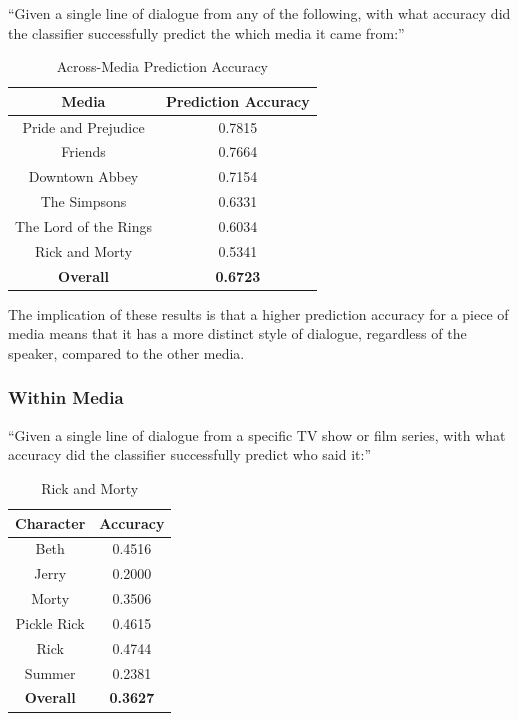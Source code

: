 \documentclass{article}
\begin{document}
\begin{titlepage}
``Given a single line of dialogue from any of the following, with what accuracy did the classifier successfully predict the which media it came from:''

\begin{table}[H]
    \centering
    \begin{tabular}{|c|c|}
        \hline
        \textbf{Media} & \textbf{Prediction Accuracy} \\
        \hline
         Pride and Prejudice & 0.7815 \\ 
         \hline
         Friends & 0.7664 \\
         \hline
         Downtown Abbey & 0.7154 \\ 
         \hline
         The Simpsons & 0.6331 \\ 
         \hline
         The Lord of the Rings & 0.6034 \\ 
         \hline
         Rick and Morty & 0.5341 \\ 
         \hline
         \textbf{Overall} & \textbf{0.6723} \\
        \hline
    \end{tabular}
    \caption{Across-Media Prediction Accuracy}
    \label{tab:my_label}
\end{table}

The implication of these results is that a higher prediction accuracy for a piece of media means that it has a more distinct style of dialogue, regardless of the speaker, compared to the other media.

\subsubsection{Within Media}

``Given a single line of dialogue from a specific TV show or film series, with what accuracy did the classifier successfully predict who said it:''

\begin{table}[H]
    \centering
    \begin{tabular}{|c|c|}
        \hline
        \textbf{Character} & \textbf{Accuracy} \\
        \hline
        Beth & 0.4516 \\
        \hline
        Jerry & 0.2000 \\
        \hline
        Morty & 0.3506 \\
        \hline
        Pickle Rick & 0.4615 \\
        \hline
        Rick & 0.4744 \\
        \hline
        Summer & 0.2381 \\
        \hline
        \textbf{Overall} & \textbf{0.3627} \\
        \hline
    \end{tabular}
    \caption{Rick and Morty}
    \label{tab:rick_and_morty_accuracy}
\end{table}


\end{titlepage}
\end{document}
